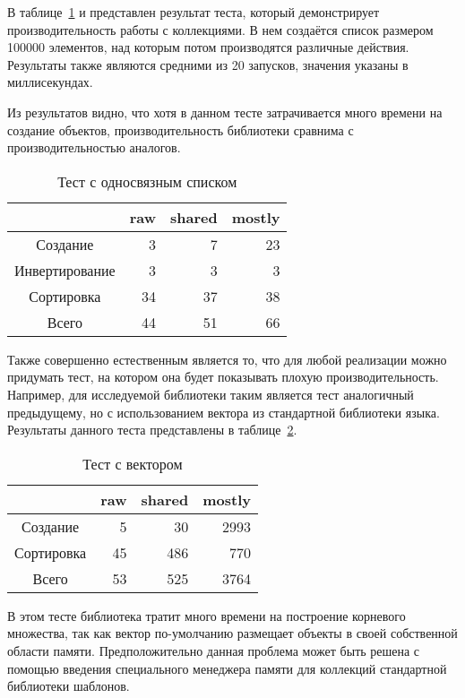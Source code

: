 В таблице~\ref{table:list} и представлен результат теста, который демонстрирует производительность работы с коллекциями. В нем создаётся список размером 100000 элементов, над которым потом производятся различные действия. Результаты также являются средними из 20 запусков, значения указаны в миллисекундах. 

Из результатов видно, что хотя в данном тесте затрачивается много времени на создание объектов, производительность библиотеки сравнима с производительностью аналогов.

\begin{table}
\centering
\begin{tabular}{| c | r | r | r |} 
\hline
& raw & shared & mostly \\
\hline
Создание & 3 & 7 & 23 \\
\hline
Инвертирование & 3 & 3 & 3 \\
\hline
Сортировка & 34 & 37 & 38 \\
\hline
Всего & 44 & 51 & 66 \\
\hline
\end{tabular}
\caption{Тест с односвязным списком}
\label{table:list}
\end{table}

Также совершенно естественным является то, что для любой реализации можно придумать тест, на котором она будет показывать плохую производительность. Например, для исследуемой библиотеки таким является тест аналогичный предыдущему, но с использованием вектора из стандартной библиотеки языка. Результаты данного теста представлены в таблице~\ref{table:vector}. 


\begin{table}
\centering
\begin{tabular}{| c | r | r | r |} 
\hline
& raw & shared & mostly \\ 
\hline
Создание & 5 & 30 & 2993 \\
\hline
Сортировка & 45 & 486 & 770 \\
\hline
Всего & 53 & 525 & 3764 \\
\hline
\end{tabular}
\caption{Тест с вектором}
\label{table:vector}
\end{table}

В этом тесте библиотека тратит много времени на построение корневого множества, так как вектор по-умолчанию размещает объекты в своей собственной области памяти. Предположительно данная проблема может быть решена с помощью введения специального менеджера памяти для коллекций стандартной библиотеки шаблонов.

